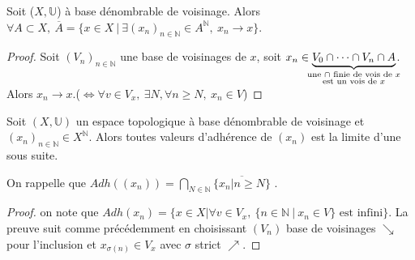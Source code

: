 \begin{proposition}
    Soit ($X,\mathbb{U}$) à base dénombrable de voisinage. Alors \\
    $\forall A\subset X,\ \overline{A}=\{x\in X\ |\ \exists (x_{n})_{n\in \mathbb{N} }\in A^\mathbb{N},\ x_{n}\to x\} $.
\end{proposition}
\begin{proof}
    Soit $(V_n)_{n\in \mathbb{N} }$ une base de voisinages de $x$, soit $x_{n}\in \underbrace{V_0\cap \cdots\cap V_n\cap A}_{\mathclap{\substack{\text{une $\cap $ finie de vois de $x$}\\ \text{est un vois de $x$}}}}$. Alors $x_{n}\to x$.($\Leftrightarrow \forall v\in V_x,\ \exists N, \forall n\ge N, \ x_{n}\in V$)
\end{proof}
\begin{proposition}
    Soit $(X,\mathbb{U})$ un espace topologique à base dénombrable de voisinage et $(x_{n})_{n\in \mathbb{N} }\in X^\mathbb{N} $. Alors toutes valeurs d'adhérence de $(x_{n})$ est la limite d'une sous suite.
\end{proposition}
On rappelle que $Adh((x_{n}))= \bigcap\limits_{N\in \mathbb{N} }\overline{\{x_{n}|n\ge N\}}$ .
\begin{proof}
     on note que $Adh(x_{n})=\{x\in X|\forall v\in V_x,\ \{n\in \mathbb{N}\ |\ x_{n}\in V\} \text{ est infini} \}$. La preuve suit comme précédemment en choisissant $(V_n)$ base de voisinages $\searrow$ pour l'inclusion et $x_{\sigma(n)}\in V_x$ avec $\sigma$ strict $\nearrow$.
\end{proof}

